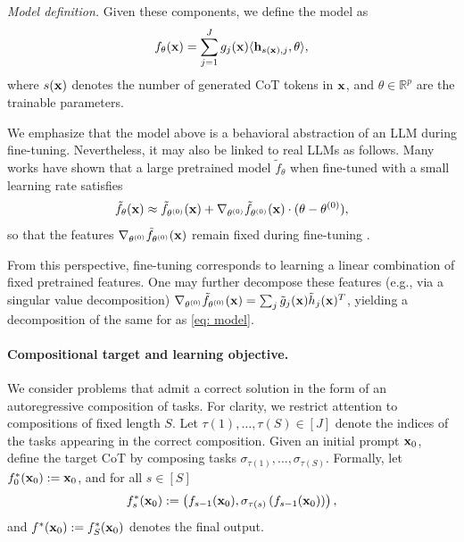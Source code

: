 \documentclass{article}
\theoremstyle{plain}
\theoremstyle{definition}
\theoremstyle{remark}
\begin{document}
\emph{Model definition.} \label{sec: model_def}
Given these components, we define the model as
\begin{align}\label{eq: model}
    f_\theta(\mathbf{x}) = \sum_{j=1}^J g_j(\mathbf{x})\langle \mathbf{h}_{s(\mathbf{x}),j}, \theta\rangle,
\end{align}
where $s(\mathbf{x})$ denotes the number of generated CoT tokens in $\mathbf{x}$, and $\theta \in \mathbb R^p$ are the trainable parameters. 

We emphasize that the model above is a behavioral abstraction of an LLM during fine-tuning. Nevertheless, it may also be linked to real LLMs as follows. Many works have shown that a large pretrained model $\tilde f_\theta$ when fine-tuned with a small learning rate satisfies
\begin{align*}
    \tilde f_{\theta}(\mathbf{x}) \approx \tilde f_{\theta^{(0)}}(\mathbf{x}) + \nabla_{\theta^{(0)}} \tilde f_{\theta^{(0)}}(\mathbf{x})\cdot (\theta - \theta^{(0)}),
\end{align*}
so that the features $\nabla_{\theta^{(0)}}\tilde f_{\theta^{(0)}}(\mathbf{x})$ remain fixed during fine-tuning \citep{jacot2018neural, lee2019wide, allen2019convergence, arora2019exact, jang2024lora}.

From this perspective, fine-tuning corresponds to learning a linear combination of fixed pretrained features. One may further decompose these features (e.g., via a singular value decomposition)  $\nabla_{\theta^{(0)}}\tilde f_{\theta^{(0)}}(\mathbf{x}) = \sum_j \tilde g_j(\mathbf{x}) \tilde h_j(\mathbf{x})^T$, yielding a decomposition of the same for as \eqref{eq: model}.



\paragraph{Compositional target and learning objective.}
We consider problems that admit a correct solution in the form of an autoregressive composition of tasks. For clarity, we restrict attention to compositions of fixed length $S$. Let $\tau(1), \dots, \tau(S) \in [J]$ denote the indices of the tasks appearing in the correct composition. Given an initial prompt $\mathbf{x}_0$, define the target CoT by composing tasks $\sigma_{\tau(1)}, \ldots, \sigma_{\tau(S)}$. Formally, let $f_0^*(\mathbf{x}_0):= \mathbf{x}_0$, and for all $s \in [S]$
\[
f_s^*(\mathbf{x}_0) := \left(f_{s-1}(\mathbf{x}_0), \sigma_{\tau(s)}\left(f_{s-1}(\mathbf{x}_0)\right)\right),
\]
and $f^*(\mathbf{x}_0):=f_S^*(\mathbf{x}_0)$ denotes the final output.
\end{document}
